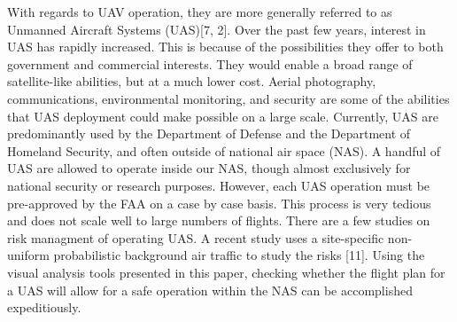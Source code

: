 With regards to UAV operation, they are more generally referred to as Unmanned Aircraft Systems (UAS)[7, 2]. Over the past few years, interest in UAS has rapidly increased. This is because of the possibilities they offer to both government and commercial interests. They would enable a broad range of satellite-like abilities, but at a much lower cost. Aerial photography, communications, environmental monitoring, and security are some of the abilities that UAS deployment could make possible on a large scale. Currently, UAS are predominantly used by the Department of Defense and the Department of Homeland Security, and often outside of national air space (NAS). A handful of UAS are allowed to operate inside our NAS, though almost exclusively for national security or research purposes. However, each UAS operation must be pre-approved by the FAA on a case by case basis. This process is very tedious and does not scale well to large numbers of flights. There are a few studies on risk managment of operating UAS. A recent study uses a site-specific non- uniform probabilistic background air traffic to study the risks [11]. Using the visual analysis tools presented in this paper, checking whether the flight plan for a UAS will allow for a safe operation within the NAS can be accomplished expeditiously.